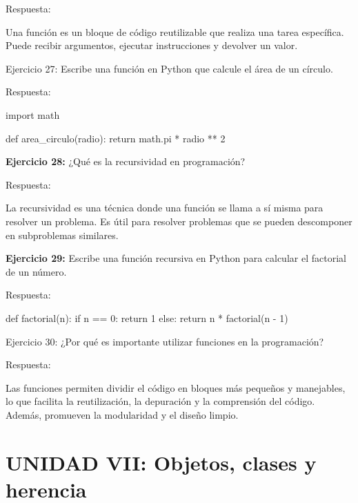\documentclass[
  a4paper,
  onepage,
  openany]{scrreprt}
\newenvironment{Shaded}{\begin{snugshade}}{\end{snugshade}}
\newcommand{\ControlFlowTok}[1]{\textcolor[rgb]{0.00,0.23,0.31}{#1}}
\newcommand{\DecValTok}[1]{\textcolor[rgb]{0.68,0.00,0.00}{#1}}
\newcommand{\ImportTok}[1]{\textcolor[rgb]{0.00,0.46,0.62}{#1}}
\newcommand{\KeywordTok}[1]{\textcolor[rgb]{0.00,0.23,0.31}{#1}}
\newcommand{\NormalTok}[1]{\textcolor[rgb]{0.00,0.23,0.31}{#1}}
\newcommand{\OperatorTok}[1]{\textcolor[rgb]{0.37,0.37,0.37}{#1}}
\begin{document}
Respuesta:

Una función es un bloque de código reutilizable que realiza una tarea
específica. Puede recibir argumentos, ejecutar instrucciones y devolver
un valor.

Ejercicio 27: Escribe una función en Python que calcule el área de un
círculo.

Respuesta:

\begin{Shaded}
\begin{Highlighting}[]
\ImportTok{import}\NormalTok{ math}

\KeywordTok{def}\NormalTok{ area\_circulo(radio):}
\ControlFlowTok{return}\NormalTok{ math.pi }\OperatorTok{*}\NormalTok{ radio }\OperatorTok{**} \DecValTok{2}
\end{Highlighting}
\end{Shaded}

\textbf{Ejercicio 28:} ¿Qué es la recursividad en programación?

Respuesta:

La recursividad es una técnica donde una función se llama a sí misma
para resolver un problema. Es útil para resolver problemas que se pueden
descomponer en subproblemas similares.

\textbf{Ejercicio 29:} Escribe una función recursiva en Python para
calcular el factorial de un número.

Respuesta:

\begin{Shaded}
\begin{Highlighting}[]
\KeywordTok{def}\NormalTok{ factorial(n):}
    \ControlFlowTok{if}\NormalTok{ n }\OperatorTok{==} \DecValTok{0}\NormalTok{:}
        \ControlFlowTok{return} \DecValTok{1}
    \ControlFlowTok{else}\NormalTok{:}
        \ControlFlowTok{return}\NormalTok{ n }\OperatorTok{*}\NormalTok{ factorial(n }\OperatorTok{{-}} \DecValTok{1}\NormalTok{)}
\end{Highlighting}
\end{Shaded}

Ejercicio 30: ¿Por qué es importante utilizar funciones en la
programación?

Respuesta:

Las funciones permiten dividir el código en bloques más pequeños y
manejables, lo que facilita la reutilización, la depuración y la
comprensión del código. Además, promueven la modularidad y el diseño
limpio.

\hypertarget{unidad-vii-objetos-clases-y-herencia-1}{%
\section{UNIDAD VII: Objetos, clases y
herencia}\label{unidad-vii-objetos-clases-y-herencia-1}}
\end{document}
